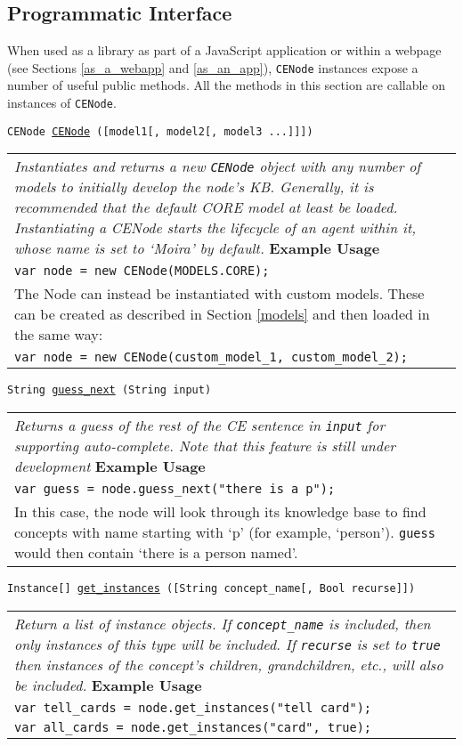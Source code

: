 \documentclass{scrartcl}
\newcommand{\js}[1]{\texttt{#1}}
\begin{document}
\subsection{Programmatic Interface}
When used as a library as part of a JavaScript application or within a webpage (see Sections \ref{as_a_webapp} and \ref{as_an_app}), \js{CENode} instances expose a number of useful public methods. All the methods in this section are callable on instances of \js{CENode}.

\newcommand{\cenodemethod}[5]{
    \begin{flushleft}
    \begin{minipage}{1.2\textwidth}
    \vskip10pt
    \begin{large}
        \noindent\js{#1 \underline{#2} (#3)}
    \end{large}
    \vskip5pt
    \begin{tabular}{|p{0.9\textwidth}}
        \textit{#4}
        \vskip8pt
        \textbf{Example Usage}\\
        #5
    \end{tabular}
    \end{minipage}
    \end{flushleft}
}

\cenodemethod{CENode}{CENode}{[model1[, model2[, model3 ...]]]}{Instantiates and returns a new \js{CENode} object with any number of models to initially develop the node's KB. Generally, it is recommended that the default CORE model at least be loaded. Instantiating a CENode starts the lifecycle of an agent within it, whose name is set to `Moira' by default.}{
    \js{var node = new CENode(MODELS.CORE);}\\
    The Node can instead be instantiated with custom models. These can be created as described in Section \ref{models} and then loaded in the same way:\\
    \js{var node = new CENode(custom\_model\_1, custom\_model\_2);}
}

\cenodemethod{String}{guess\_next}{String input}{Returns a guess of the rest of the CE sentence in \js{input} for supporting auto-complete. Note that this feature is still under development}{
    \js{var guess = node.guess\_next("there is a p");}\\
    In this case, the node will look through its knowledge base to find concepts with name starting with `p' (for example, `person'). \js{guess} would then contain `there is a person named'.
}

\cenodemethod{Instance[]}{get\_instances}{[String concept\_name[, Bool recurse]]}{Return a list of instance objects. If \js{concept\_name} is included, then only instances of this type will be included. If \js{recurse} is set to \js{true} then instances of the concept's children, grandchildren, etc., will also be included.}{
    \js{var tell\_cards = node.get\_instances("tell card");}\\
    \js{var all\_cards = node.get\_instances("card", true);}
}
\end{document}
